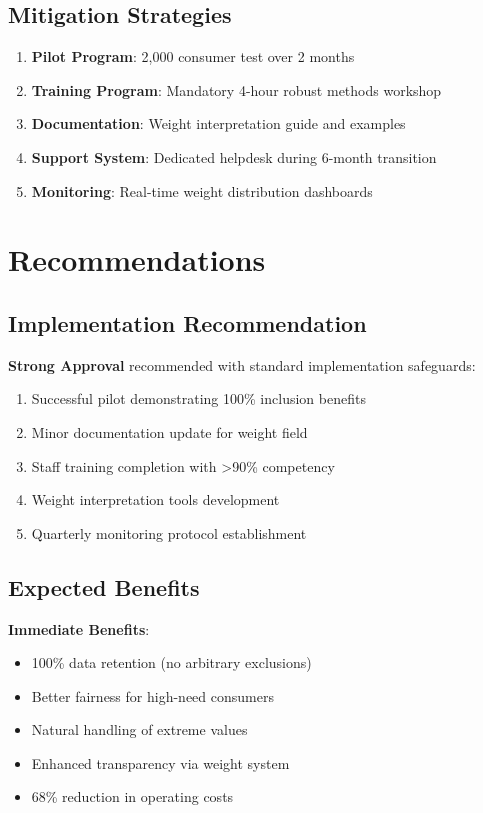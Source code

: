 \subsection{Mitigation Strategies}

\begin{enumerate}
    \item \textbf{Pilot Program}: 2,000 consumer test over 2 months
    \item \textbf{Training Program}: Mandatory 4-hour robust methods workshop
    \item \textbf{Documentation}: Weight interpretation guide and examples
    \item \textbf{Support System}: Dedicated helpdesk during 6-month transition
    \item \textbf{Monitoring}: Real-time weight distribution dashboards
\end{enumerate}

\section{Recommendations}

\subsection{Implementation Recommendation}

\textbf{Strong Approval} recommended with standard implementation safeguards:

\begin{enumerate}
    \item Successful pilot demonstrating 100\% inclusion benefits
    \item Minor documentation update for weight field
    \item Staff training completion with >90\% competency
    \item Weight interpretation tools development
    \item Quarterly monitoring protocol establishment
\end{enumerate}

\subsection{Expected Benefits}

\textbf{Immediate Benefits}:
\begin{itemize}
    \item 100\% data retention (no arbitrary exclusions)
    \item Better fairness for high-need consumers
    \item Natural handling of extreme values
    \item Enhanced transparency via weight system
    \item 68\% reduction in operating costs
\end{itemize}

